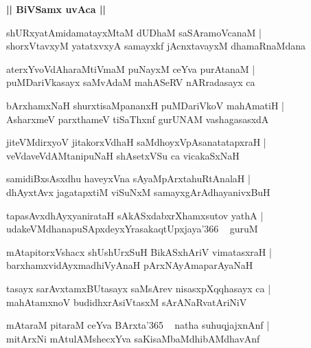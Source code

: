 \documentclass[twoside,12pt,openright]{book}
\newcounter{shloka}[chapter]
\def\uvaca#1{\centerline{{\large\textbf{#1}}}}
\begin{document}
\uvaca{|| BiVSamx uvAca ||}

\begin{shloka}%
shURxyatAmidamatayxMtaM dUDhaM saSAramoVcanaM |\\
shorxVtavxyM yatatxvxyA samayxkf jAcnxtavayxM dhamaRnaMdana 
\end{shloka}

\begin{shloka}%
aterxYvoVdAharaMtiVmaM puNayxM ceYva purAtanaM |\\
puMDariVkasayx saMvAdaM mahASeRV nARradasayx ca 
\end{shloka}

\begin{shloka}%
bArxhamxNaH shurxtisaMpananxH puMDariVkoV mahAmatiH |\\
AsharxmeV parxthameV tiSaThxnf gurUNAM vashagasasxdA 
\end{shloka}

\begin{shloka}%
jiteVMdirxyoV jitakorxVdhaH saMdhoyxVpAsanatatapxraH |\\
veVdaveVdAMtanipuNaH shAsetxVSu ca vicakaSxNaH
\end{shloka}

\begin{shloka}%
samidiBxsAsxdhu haveyxVna sAyaMpArxtahuRtAnalaH |\\
dhAyxtAvx jagatapxtiM viSuNxM samayxgArAdhayanivxBuH 
\end{shloka}

\begin{shloka}%
tapasAvxdhAyxyanirataH sAkASxdabxrXhamxsutov yathA |\\
udakeVMdhanapuSApxdeyxYrasakaqtUpxjaya\char'366 ~ guruM 
\end{shloka}

\begin{shloka}%
mAtapitorxVshacx shUshUrxSuH BikASxhAriV vimatasxraH |\\
barxhamxvidAyxmadhiVyAnaH pArxNAyAmaparAyaNaH 
\end{shloka}

\begin{shloka}%
tasayx sarAvxtamxBUtasayx saMsArev nisasxpXqqhasayx ca |\\
mahAtamxnoV budidhxrAsiVtasxM sArANaRvatAriNiV 
\end{shloka}

\begin{shloka}%
mAtaraM pitaraM ceYva BArxta\char'365 ~ natha suhuqjajxnAnf |\\
mitArxNi mAtulAMshecxYva saKisaMbaMdhibAMdhavAnf 
\end{shloka}
\end{document}
